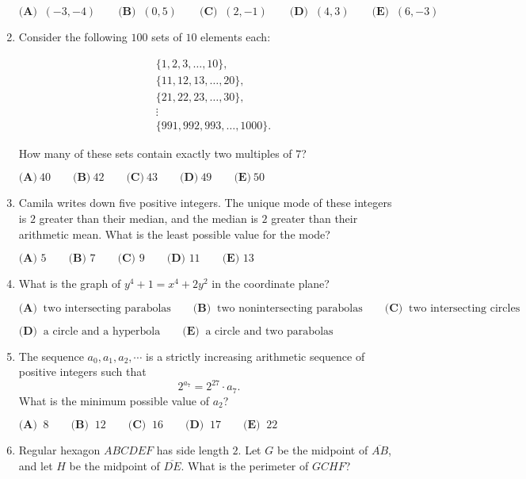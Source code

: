 \documentclass{article}
\begin{document}
\begin{enumerate}[label=\arabic*., itemsep=0.5em]
\(\textbf{(A) }\ (-3, -4) \qquad \textbf{(B) }\ (0,5) \qquad \textbf{(C) }\ (2,-1) \qquad \textbf{(D) }\ (4,3) \qquad \textbf{(E) }\ (6,-3)\)\par \vspace{0.5em}\item Consider the following \(100\) sets of \(10\) elements each:

\begin{align*}
&\{1,2,3,\ldots,10\}, \\
&\{11,12,13,\ldots,20\},\\
&\{21,22,23,\ldots,30\},\\
&\vdots\\
&\{991,992,993,\ldots,1000\}.
\end{align*}

How many of these sets contain exactly two multiples of \(7\)?

\(\textbf{(A)}\ 40\qquad\textbf{(B)}\ 42\qquad\textbf{(C)}\ 43\qquad\textbf{(D)}\ 49\qquad\textbf{(E)}\ 50\)\par \vspace{0.5em}\item Camila writes down five positive integers. The unique mode of these integers is \(2\) greater than their median, and the median is \(2\) greater than their arithmetic mean. What is the least possible value for the mode?

\(\textbf{(A) }5\qquad\textbf{(B) }7\qquad\textbf{(C) }9\qquad\textbf{(D) }11\qquad\textbf{(E) }13\)\par \vspace{0.5em}\item What is the graph of \(y^4+1=x^4+2y^2\) in the coordinate plane?

\(\textbf{(A) }\ \text{two intersecting parabolas} \qquad \textbf{(B) }\ \text{two nonintersecting parabolas} \qquad \textbf{(C) }\ \text{two intersecting circles} \qquad\)

\(\textbf{(D) }\ \text{a circle and a hyperbola} \qquad \textbf{(E) }\ \text{a circle and two parabolas}\)\par \vspace{0.5em}\item The sequence \(a_0,a_1,a_2,\cdots\) is a strictly increasing arithmetic sequence of positive integers such that 
\begin{equation*}
2^{a_7}=2^{27} \cdot a_7.
\end{equation*}
 What is the minimum possible value of \(a_2\)?

\(\textbf{(A) }\ 8 \qquad \textbf{(B) }\ 12 \qquad \textbf{(C) }\ 16 \qquad \textbf{(D) }\ 17 \qquad \textbf{(E) }\ 22\)\par \vspace{0.5em}\item Regular hexagon \(ABCDEF\) has side length \(2\). Let \(G\) be the midpoint of \(\overline{AB}\), and let \(H\) be the midpoint of \(\overline{DE}\). What is the perimeter of \(GCHF\)?


\end{enumerate}
\end{document}

